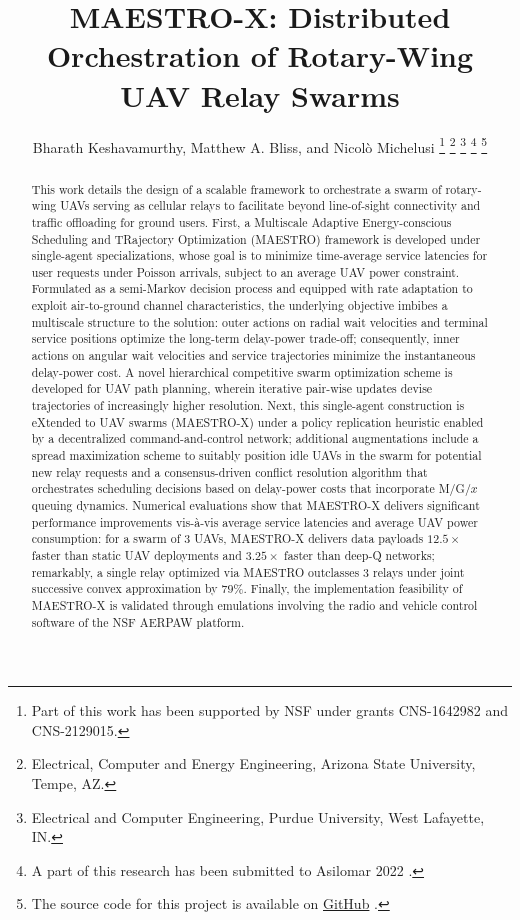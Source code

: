 \documentclass[12pt, draftcls, onecolumn]{IEEEtran}
\title{MAESTRO-X: Distributed Orchestration of Rotary-Wing UAV Relay Swarms}
\author{Bharath Keshavamurthy\IEEEauthorrefmark{1}, Matthew A. Bliss\IEEEauthorrefmark{2}, and Nicol\`{o} Michelusi\IEEEauthorrefmark{1}
\thanks{Part of this work has been supported by NSF under grants CNS-1642982 and CNS-2129015.}
\thanks{\IEEEauthorrefmark{1}Electrical, Computer and Energy Engineering, Arizona State University, Tempe, AZ.}
\thanks{\IEEEauthorrefmark{2}Electrical and Computer Engineering, Purdue University, West Lafayette, IN.}
\thanks{A part of this research has been submitted to Asilomar 2022 \cite{ASILOMAR}.}
\thanks{The source code for this project is available on \href{https://github.com/bharathkeshavamurthy/MAESTRO-X.git}{GitHub} \cite{MAESTRO-X}.}
\vspace{-6mm}
}
\theoremstyle{plain}
\theoremstyle{definition}
\theoremstyle{remark}
\begin{document}

\maketitle
\thispagestyle{plain}
\pagestyle{plain}
\vspace{-15mm}


\begin{abstract}
This work details the design of a scalable framework to orchestrate a swarm of rotary-wing UAVs serving as cellular relays to facilitate beyond line-of-sight connectivity and traffic offloading for ground users. First, a Multiscale Adaptive Energy-conscious Scheduling and TRajectory Optimization (MAESTRO) framework is developed under single-agent specializations, whose goal is to minimize time-average service latencies for user requests under Poisson arrivals, subject to an average UAV power constraint. Formulated as a semi-Markov decision process and equipped with rate adaptation to exploit air-to-ground channel characteristics, the underlying objective imbibes a multiscale structure to the solution: outer actions on radial wait velocities and terminal service positions optimize the long-term delay-power trade-off; consequently, inner actions on angular wait velocities and service trajectories minimize the instantaneous delay-power cost. A novel hierarchical competitive swarm optimization scheme is developed for UAV path planning, wherein iterative pair-wise updates devise trajectories of increasingly higher resolution. Next, this single-agent construction is eXtended to UAV swarms (MAESTRO-X) under a policy replication heuristic enabled by a decentralized command-and-control network; additional augmentations include a spread maximization scheme to suitably position idle UAVs in the swarm for potential new relay requests and a consensus-driven conflict resolution algorithm that orchestrates scheduling decisions based on delay-power costs that incorporate M/G/$x$ queuing dynamics. Numerical evaluations show that MAESTRO-X delivers significant performance improvements vis-à-vis average service latencies and average UAV power consumption: for a swarm of $3$ UAVs, MAESTRO-X delivers  data payloads $12.5\times$ faster than static UAV deployments and $3.25\times$ faster than deep-Q networks; remarkably, a single relay optimized via MAESTRO outclasses $3$ relays under joint successive convex approximation by $79$\%. Finally, the implementation feasibility of MAESTRO-X is validated through emulations involving the radio and vehicle control software of the NSF AERPAW platform.
\end{abstract}
\vspace{-4mm}
\end{document}
